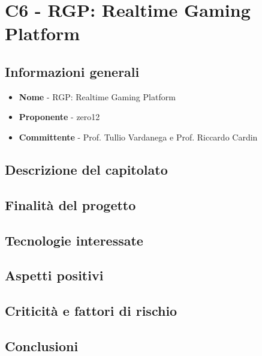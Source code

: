 \chapter{C6 - RGP: Realtime Gaming Platform}
\section{Informazioni generali}
\begin{itemize}
	\item \textbf{Nome} - RGP: Realtime Gaming Platform
	\item \textbf{Proponente} - zero12
	\item \textbf{Committente} - Prof. Tullio Vardanega e Prof. Riccardo Cardin
\end{itemize}
\section{Descrizione del capitolato}
\section{Finalità del progetto}
\section{Tecnologie interessate}
\section{Aspetti positivi}
\section{Criticità e fattori di rischio}
\section{Conclusioni}